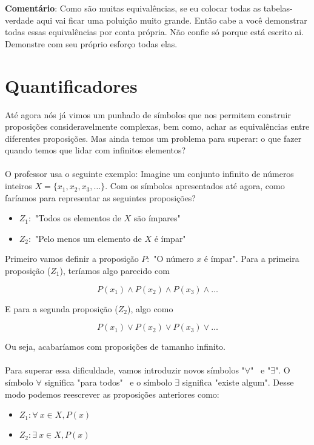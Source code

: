 \documentclass[a4paper,11pt]{book}
\theoremstyle{definition}
\theoremstyle{break}
\begin{document}
\textbf{Comentário}: Como são muitas equivalências, se eu colocar todas as tabelas-verdade aqui vai ficar uma poluição muito grande. Então cabe a você demonstrar todas essas equivalências por conta própria. Não confie só porque está escrito ai. Demonstre com seu próprio esforço todas elas.

\section{Quantificadores}

Até agora nós já vimos um punhado de símbolos que nos permitem construir proposições consideravelmente complexas, bem como, achar as equivalências entre diferentes proposições. Mas ainda temos um problema para superar: o que fazer quando temos que lidar com infinitos elementos?
\\
\\
O professor usa o seguinte exemplo: Imagine um conjunto infinito de números inteiros $X = \{ x_1,x_2,x_3, \dots \}$. Com os símbolos apresentados até agora, como faríamos para representar as seguintes proposições?

\begin{itemize}
\item $Z_1:$ "Todos os elementos de $X$ são ímpares"
\item $Z_2:$ "Pelo menos um elemento de $X$ é ímpar"
\end{itemize}

Primeiro vamos definir a proposição $P :$ "O número $x$ é ímpar". Para a primeira proposição ($Z_1$), teríamos algo parecido com 

$$P(x_1) \land P(x_2) \land P(x_3) \land \dots$$

E para a segunda proposição ($Z_2$), algo como

$$P(x_1) \lor P(x_2) \lor P(x_3) \lor \dots$$

Ou seja, acabaríamos com proposições de tamanho infinito.
\\
\\
Para superar essa dificuldade, vamos introduzir novos símbolos "$\forall$" \ e "$\exists$". O símbolo $\forall$ significa "para todos" \ e o símbolo $\exists$ significa "existe algum". Desse modo podemos reescrever as proposições anteriores como:

\begin{itemize}
\item $Z_1: \forall \ x \in X, P(x)$
\item $Z_2: \exists \ x \in X, P(x)$
\end{itemize}
\end{document}
